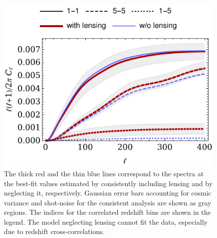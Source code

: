 \begin{figure}[tp]
  \centering
  \includegraphics[width=\columnwidth]{figures/chapter-mnu/fid_shift.pdf}
  \caption{
    The thick red and the thin blue lines correspond to the spectra at the best-fit values estimated by consistently including lensing and by neglecting it, respectively.
    Gaussian error bars accounting for cosmic variance and shot-noise for the consistent analysis are shown as gray regions.
    The indices for the correlated redshift bins are shown in the legend.
    The model neglecting lensing cannot fit the data, especially due to redshift cross-correlations.
  }
  \label{fig:cl}
\end{figure}


